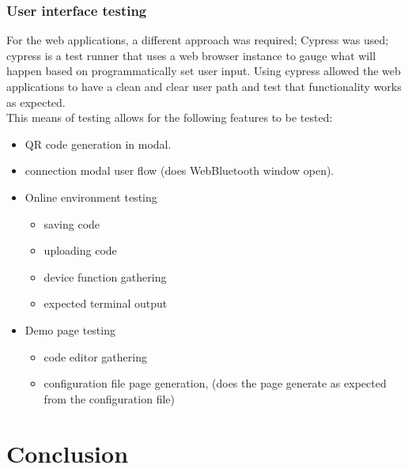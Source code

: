 \documentclass{l4proj}
\begin{document}
\subsection{User interface testing}
For the web applications, a different approach was required; Cypress was used; cypress is a test runner that uses a web browser instance to gauge what will happen based on programmatically set user input. Using cypress allowed the web applications to have a clean and clear user path and test that functionality works as expected.
\\
This means of testing allows for the following features to be tested:
\begin{itemize}
    \item QR code generation in modal.
    \item connection modal user flow (does WebBluetooth window open).
    \item Online environment testing 
    \begin{itemize}
        \item saving code
        \item uploading code
        \item device function gathering
        \item expected terminal output
    \end{itemize}
    \item Demo page testing
    \begin{itemize}
        \item code editor gathering
        \item configuration file page generation, (does the page generate as expected from the configuration file)
    \end{itemize}
\end{itemize}


\chapter{Conclusion}    
\end{document}
